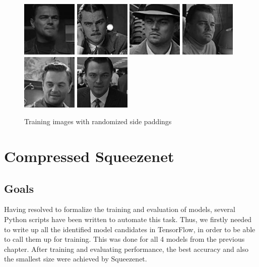 \begin{figure}[ht!]
    \includegraphics[width = 2.4 cm]{images/leo/3c5d0190660}\hfill
    \includegraphics[width = 2.4 cm]{images/leo/3e3f6a53350}\hfill
    \includegraphics[width = 2.4 cm]{images/leo/3f4b0e0c760}\hfill
    \includegraphics[width = 2.4 cm]{images/leo/4b605e33360}\hfill
    \includegraphics[width = 2.4 cm]{images/leo/24eb14f9da0}\hfill
    \includegraphics[width = 2.4 cm]{images/leo/188d3b34ff1}\hfill
    \caption{Training images with randomized side paddings}
\end{figure}

\section{Compressed Squeezenet}
\subsection{Goals}
Having resolved to formalize the training and evaluation of models, several Python scripts have been written to automate this task. Thus, we firstly needed to write up all the identified model candidates in TensorFlow, in order to be able to call them up for training. This was done for all 4 models from the previous chapter. After training and evaluating performance, the best accuracy and also the smallest size were achieved by Squeezenet.

